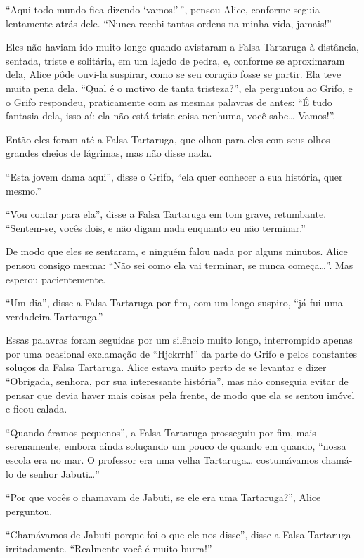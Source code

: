 ``Aqui todo mundo fica dizendo `vamos!'\,'', pensou Alice, conforme seguia
lentamente atrás dele. ``Nunca recebi tantas ordens na minha vida,
jamais!''

Eles não haviam ido muito longe quando avistaram a Falsa Tartaruga à
distância, sentada, triste e solitária, em um lajedo de pedra, e,
conforme se aproximaram dela, Alice pôde ouvi-la suspirar, como se seu
coração fosse se partir. Ela teve muita pena dela. ``Qual é o motivo de
tanta tristeza?'', ela perguntou ao Grifo, e o Grifo respondeu,
praticamente com as mesmas palavras de antes: ``É tudo fantasia dela,
isso aí: ela não está triste coisa nenhuma, você sabe\ldots{} Vamos!''.

Então eles foram até a Falsa Tartaruga, que olhou para eles com seus
olhos grandes cheios de lágrimas, mas não disse nada.

``Esta jovem dama aqui'', disse o Grifo, ``ela quer conhecer a sua
história, quer mesmo.''

``Vou contar para ela'', disse a Falsa Tartaruga em tom grave,
retumbante. ``Sentem-se, vocês dois, e não digam nada enquanto eu não
terminar.''

De modo que eles se sentaram, e ninguém falou nada por alguns minutos.
Alice pensou consigo mesma: ``Não sei como ela vai terminar, se nunca
começa\ldots{}''. Mas esperou pacientemente.

``Um dia'', disse a Falsa Tartaruga por fim, com um longo suspiro, ``já
fui uma verdadeira Tartaruga.''

Essas palavras foram seguidas por um silêncio muito longo, interrompido
apenas por uma ocasional exclamação de ``Hjckrrh!'' da parte do Grifo e
pelos constantes soluços da Falsa Tartaruga. Alice estava muito perto de
se levantar e dizer ``Obrigada, senhora, por sua interessante história'',
mas não conseguia evitar de pensar que devia haver mais coisas pela
frente, de modo que ela se sentou imóvel e ficou calada.

``Quando éramos pequenos'', a Falsa Tartaruga prosseguiu por fim, mais
serenamente, embora ainda soluçando um pouco de quando em quando,
``nossa escola era no mar. O professor era uma velha Tartaruga\ldots{}
costumávamos chamá-lo de senhor Jabuti\ldots{}''

``Por que vocês o chamavam de Jabuti, se ele era uma Tartaruga?'', Alice
perguntou.

``Chamávamos de Jabuti porque foi o que ele nos disse'', disse a Falsa
Tartaruga irritadamente. ``Realmente você é muito burra!''

